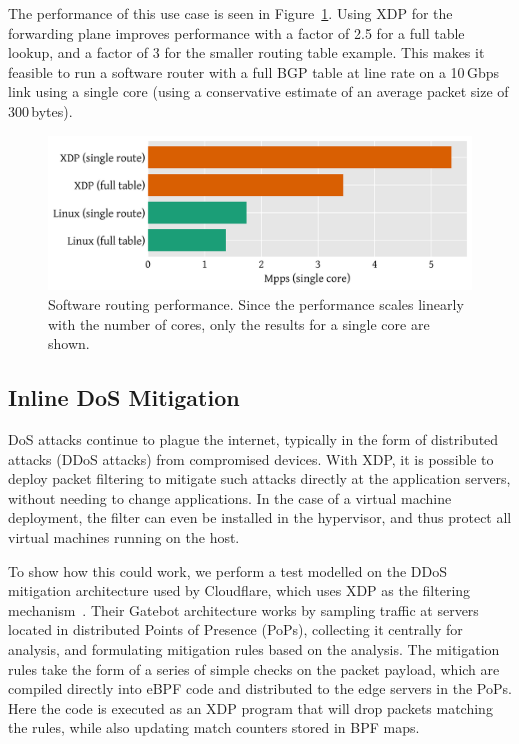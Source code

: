 \documentclass[sigconf]{acmart}
\begin{document}
The performance of this use case is seen in Figure~\ref{fig:router-fwd}. Using
XDP for the forwarding plane improves performance with a factor of 2.5 for a
full table lookup, and a factor of 3 for the smaller routing table example. This
makes it feasible to run a software router with a full BGP table at line rate on
a 10\,Gbps link using a single core (using a conservative estimate of an average
packet size of 300\,bytes).

\begin{figure}[t]
\centering
\includegraphics[width=\linewidth]{figures/router-fwd.pdf}
\caption{\label{fig:router-fwd} Software routing performance. Since the
  performance scales linearly with the number of cores, only the results for a
  single core are shown.}
\end{figure}


\subsection{Inline DoS Mitigation}
\label{sec:dos-usecase}
DoS attacks continue to plague the internet, typically in the form of
distributed attacks (DDoS attacks) from compromised devices. With XDP, it is
possible to deploy packet filtering to mitigate such attacks directly at the
application servers, without needing to change applications. In the case of a
virtual machine deployment, the filter can even be installed in the hypervisor,
and thus protect all virtual machines running on the host.

To show how this could work, we perform a test modelled on the DDoS mitigation
architecture used by Cloudflare, which uses XDP as the filtering
mechanism~\cite{cloudflare-ddos}. Their Gatebot architecture works by sampling
traffic at servers located in distributed Points of Presence (PoPs), collecting
it centrally for analysis, and formulating mitigation rules based on the
analysis. The mitigation rules take the form of a series of simple checks on the
packet payload, which are compiled directly into eBPF code and distributed to
the edge servers in the PoPs. Here the code is executed as an XDP program that
will drop packets matching the rules, while also updating match counters stored
in BPF maps.
\end{document}
